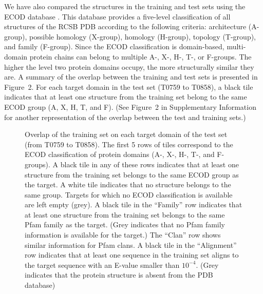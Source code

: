 \documentclass{bioinfo}
\begin{document}
We have also compared the structures in the training and test sets
using the ECOD database \citep{cheng2014ecod}. This database provides a
five-level classification of all structures of the RCSB PDB
\citep{berman2000protein} according to the following criteria:
architecture (A-group), possible homology (X-group), homology
(H-group), topology (T-group), and family (F-group).  Since the ECOD
classification is domain-based, multi-domain protein chains can belong
to multiple A-, X-, H-, T-, or F-groups.  The higher the level two
protein domains occupy, the more structurally similar they are.
%
A summary of the overlap between the training and test sets is
presented in Figure~2\vphantom{\ref{Fig:summaryTable}}. For each target domain in
the test set (T0759 to T0858), a black tile indicates that at least
one structure from the training set belong to the same ECOD group (A,
X, H, T, and F). (See Figure~2\vphantom{S2} in Supplementary Information for another
representation of the overlap between the test and training sets.)

\begin{figure}[!tpb]
%
    \caption{Overlap of the training set on each target domain of the
    test set (from T0759 to T0858). The first 5 rows of tiles
    correspond to the ECOD classification of protein domains (A-, X-,
    H-, T-, and F-groups). A black tile in any of these rows indicates
    that at least one structure from the training set belongs to the
    same ECOD group as the target. A white tile indicates that no
    structure belongs to the same group. Targets for which no ECOD
    classification is available are left empty (grey).
    A black tile in the ``Family'' row indicates that at least one
    structure from the training set belongs to the same Pfam family as
    the target. (Grey indicates that no Pfam family information is
    available for the target.) The ``Clan'' row shows similar
    information for Pfam clans. A black tile in the ``Alignment'' row
    indicates that at least one sequence in the training set aligns to
    the target sequence with an E-value smaller than $10^{-4}$. (Grey
    indicates that the protein structure is absent from the PDB database)}
    \label{Fig:summaryTable}
\end{figure}
\end{document}
